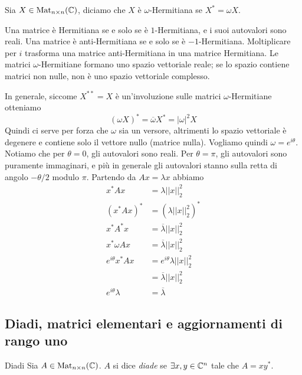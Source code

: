 \documentclass[a4paper]{article}
\begin{document}
\begin{snippetdefinition}{}
    Sia \(X \in \operatorname{Mat}_{n \times n}(\mathbb{C})\),
    diciamo che \(X\) è \(\omega\)-Hermitiana se \(X^* = \omega X\).
\end{snippetdefinition}

Una matrice è Hermitiana se e solo se è \(1\)-Hermitiana, e i suoi autovalori sono reali.
Una matrice è anti-Hermitiana se e solo se è \(-1\)-Hermitiana.
Moltiplicare per \(i\) trasforma una matrice anti-Hermitiana in una matrice Hermitiana.
Le matrici \(\omega\)-Hermitiane formano uno spazio vettoriale reale; se lo spazio contiene matrici non nulle, non è uno spazio vettoriale complesso.

In generale, siccome \(X^{**}=X\) è un'involuzione sulle matrici \(\omega\)-Hermitiane otteniamo
\[
    (\omega X)^* = \overline \omega X^* = |\omega|^2 X
\]
Quindi ci serve per forza che \(\omega\) sia un versore, altrimenti lo spazio vettoriale è degenere e contiene solo
il vettore nullo (matrice nulla).
Vogliamo quindi \(\omega = e^{i\theta}\).
Notiamo che per \(\theta = 0\), gli autovalori sono reali.
Per \(\theta = \pi\), gli autovalori sono puramente immaginari,
e più in generale gli autovalori stanno sulla retta di angolo \(-\theta/2\) modulo \(\pi\).
Partendo da \(Ax = \lambda x\) abbiamo
\begin{align*}
    x^* A x &= \lambda ||x||_2^2 \\
    (x^* A x)^* &= (\lambda ||x||_2^2)^* \\
    x^* A^* x &= \overline \lambda ||x||_2^2 \\
    x^* \omega A x &= \overline \lambda ||x||_2^2 \\
    e^{i\theta} x^* A x &= e^{i\theta} \lambda ||x||_2^2 \\
    &= \overline \lambda ||x||_2^2 \\
    e^{i\theta} \lambda &= \overline \lambda
\end{align*}

\subsection{Diadi, matrici elementari e aggiornamenti di rango uno}

\begin{snippetdefinition}{Diadi}
    Sia \(A \in \operatorname{Mat}_{n \times n}(\mathbb{C})\).
    \(A\) si dice \emph{diade}
    se \(\exists x,y \in \mathbb{C}^n\) tale che \(A = xy^*\).
\end{snippetdefinition}
\end{document}
